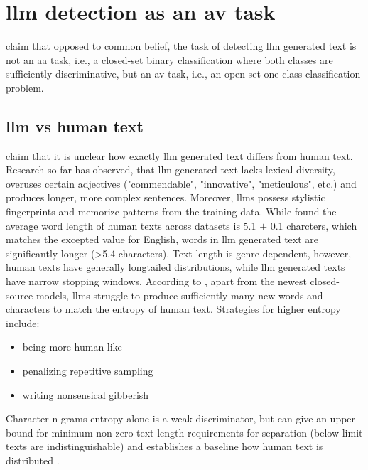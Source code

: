 \section{\ac{llm} detection as an \ac{av} task}
\label{sec:llm_detection_av}

\citet{llm_detection_av_2025} claim that opposed to common belief, the task of detecting \ac{llm} generated text is not an \ac{aa} task,
i.e., a closed-set binary classification where both classes are sufficiently discriminative, 
but an \ac{av} task, i.e., an open-set one-class classification problem. 

\subsection{\ac{llm} vs human text}

\citet{llm_detection_av_2025} claim that it is unclear how exactly \ac{llm} generated text differs from human text.
Research so far has observed, that \ac{llm} generated text lacks lexical diversity, 
overuses certain adjectives ("commendable", "innovative", "meticulous", etc.) and produces longer, more complex sentences.
Moreover, \acp{llm} possess stylistic fingerprints and memorize patterns from the training data.
While \citet{llm_detection_av_2025} found the average word length of human texts across datasets is 5.1 $\pm$ 0.1 charcters, 
which matches the excepted value for English, 
words in \ac{llm} generated text are significantly longer (>5.4 characters).
Text length is genre-dependent, however, human texts have generally longtailed distributions, 
while \ac{llm} generated texts have narrow stopping windows. 
According to \citet{llm_detection_av_2025}, apart from the newest closed-source models, 
\acp{llm} struggle to produce sufficiently many new words and characters to match the entropy of human text.
Strategies for higher entropy include:
\begin{itemize}
    \item being more human-like
    \item penalizing repetitive sampling
    \item writing nonsensical gibberish
\end{itemize}
Character n-grams entropy alone is a weak discriminator, 
but can give an upper bound for minimum non-zero text length requirements for separation (below limit texts are indistinguishable) and 
establishes a baseline how human text is distributed \citep{llm_detection_av_2025}.

